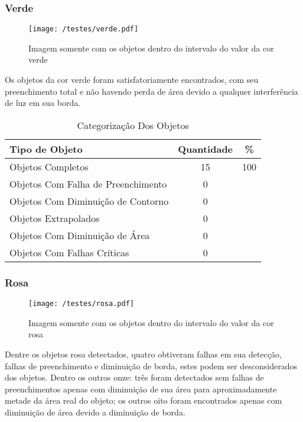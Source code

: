 \subsubsection{Verde}
\begin{figure}[H]
		\centering
		\texttt{[image: /testes/verde.pdf]}
		\caption{Imagem somente com os objetos dentro do intervalo do valor da cor verde}
		\label{disposicaoparte}
	\end{figure}

Os objetos da cor verde foram satisfatoriamente encontrados, com seu preenchimento total e não havendo perda de área devido a qualquer interferência de luz em sua borda.	
	
\begin{table}[h]
\centering
\begin{tabular}{l|c|c}
Tipo de Objeto & Quantidade & \% \\ %
\hline                               %
Objetos Completos &  15 &100 \\
\hline 
Objetos Com Falha de Preenchimento & 0\\
\hline 
Objetos Com Diminuição de Contorno &  0\\
\hline 
Objetos Extrapolados & 0 \\
\hline 
Objetos Com Diminuição de Área &  0 \\
\hline 
Objetos Com Falhas Críticas & 0 \\
\hline 
\end{tabular}
\caption{Categorização Dos Objetos}
\end{table}	
\subsubsection{Rosa}
	
	\begin{figure}[H]
		\centering
		\texttt{[image: /testes/rosa.pdf]}
		\caption{Imagem somente com os objetos dentro do intervalo do valor da cor rosa}
		\label{disposicaoparte}
	\end{figure}
	
Dentre os objetos rosa detectados, quatro obtiveram falhas em sua detecção, falhas de preenchimento e diminuição de borda, estes podem ser desconsiderados dos objetos. Dentro os outros onze: três foram detectados sem falhas de preenchimentos apenas com diminuição de sua área para aproximadamente metade da área real do objeto; os outros oito foram encontrados apenas com diminuição de área devido a diminuição de borda.
	

